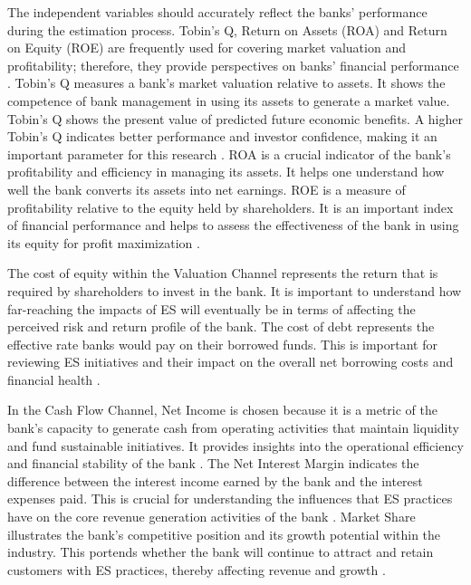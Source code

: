 \documentclass[11pt, a4paper]{article}
\begin{document}
The independent variables should accurately reflect the banks' performance during the estimation process. Tobin’s Q, Return on Assets (ROA) and Return on Equity (ROE) are frequently used for covering market valuation and profitability; therefore, they provide perspectives on banks' financial performance \citep{Fernandes2018, Nsour2021}. Tobin’s Q measures a bank's market valuation relative to assets. It shows the competence of bank management in using its assets to generate a market value. Tobin's Q shows the present value of predicted future economic benefits. A higher Tobin's Q indicates better performance and investor confidence, making it an important parameter for this research \citep{Copeland1988}. ROA is a crucial indicator of the bank's profitability and efficiency in managing its assets. It helps one understand how well the bank converts its assets into net earnings. ROE is a measure of profitability relative to the equity held by shareholders. It is an important index of financial performance and helps to assess the effectiveness of the bank in using its equity for profit maximization \citep{Klaassen2015}.

The cost of equity within the Valuation Channel represents the return that is required by shareholders to invest in the bank. It is important to understand how far-reaching the impacts of ES will eventually be in terms of affecting the perceived risk and return profile of the bank. The cost of debt represents the effective rate banks would pay on their borrowed funds. This is important for reviewing ES initiatives and their impact on the overall net borrowing costs and financial health \citep{Beltrame2018}.

In the Cash Flow Channel, Net Income is chosen because it is a metric of the bank's capacity to generate cash from operating activities that maintain liquidity and fund sustainable initiatives. It provides insights into the operational efficiency and financial stability of the bank \citep{Zouaoui2023}. The Net Interest Margin indicates the difference between the interest income earned by the bank and the interest expenses paid. This is crucial for understanding the influences that ES practices have on the core revenue generation activities of the bank \citep{Hughes2019}. Market Share illustrates the bank's competitive position and its growth potential within the industry. This portends whether the bank will continue to attract and retain customers with ES practices, thereby affecting revenue and growth \citep{Berger2009}.
\end{document}
